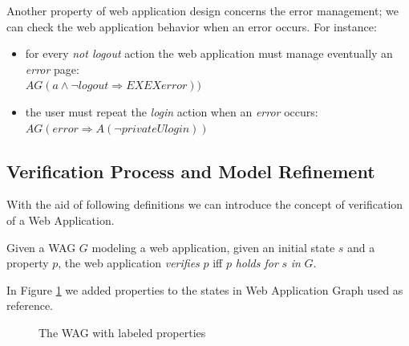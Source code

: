 \normalsize
Another property of web application design concerns the error management; we can check the web application behavior when an error occurs. For instance:

\footnotesize
\begin{itemize}
	\item for every \emph{not logout} action the web application must manage eventually an \emph{error} page:\\
$AG(a \wedge \neg logout \Rightarrow EXEX error)) $
	\item the user must repeat the \emph{login} action when an \emph{error} occurs:\\
$AG(error \Rightarrow A(\neg private U login))$
\end {itemize}


\normalsize



\subsection{Verification Process and Model Refinement}
With the aid of following definitions we can introduce the concept of verification of a Web Application.

\footnotesize
\begin{definition}\label{def:model checking} 
Given a WAG $G$ modeling a web application, given an initial state $s$ and a property $p$, the web application \emph{verifies} $p$ iff $p$ \emph{holds for} $s$ \emph{in} $G$. 
\end{definition}

\normalsize
In Figure \ref{fig2} we added properties to the  states in Web Application Graph used as reference. 

\begin{figure}[ht]
\centerline{}
\caption{The WAG with labeled properties \label{fig2}}
\end{figure}

